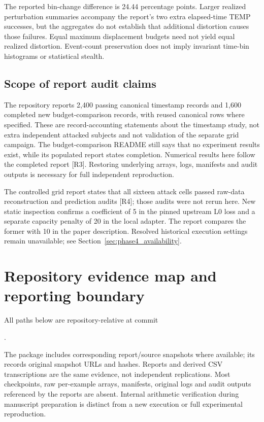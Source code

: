 \documentclass[10pt,onecolumn]{article}
\newcommand{\rref}[1]{\textup{[R#1]}}
\begin{document}
The reported bin-change difference is 24.44 percentage points. Larger realized perturbation summaries accompany the report's two extra elapsed-time TEMP successes, but the aggregates do not establish that additional distortion causes those failures. Equal maximum displacement budgets need not yield equal realized distortion. Event-count preservation does not imply invariant time-bin histograms or statistical stealth.

\subsection{Scope of report audit claims}
The repository reports 2,400 passing canonical timestamp records and 1,600 completed new budget-comparison records, with reused canonical rows where specified. These are record-accounting statements about the timestamp study, not extra independent attacked subjects and not validation of the separate grid campaign. The budget-comparison README still says that no experiment results exist, while its populated report states completion. Numerical results here follow the completed report \rref{3}. Restoring underlying arrays, logs, manifests and audit outputs is necessary for full independent reproduction.

The controlled grid report states that all sixteen attack cells passed raw-data reconstruction and prediction audits \rref{4}; those audits were not rerun here. New static inspection confirms a coefficient of 5 in the pinned upstream L0 loss and a separate capacity penalty of 20 in the local adapter. The report compares the former with 10 in the paper description. Resolved historical execution settings remain unavailable; see Section~\ref{sec:phase4_availability}.

\clearpage



\clearpage
\section{Repository evidence map and reporting boundary}
\label{sec:evidence}
All paths below are repository-relative at commit
\begin{center}
.
\end{center}
The package includes corresponding report/source snapshots where available; its  records original snapshot URLs and hashes. Reports and derived CSV transcriptions are the same evidence, not independent replications. Most checkpoints, raw per-example arrays, manifests, original logs and audit outputs referenced by the reports are absent. Internal arithmetic verification during manuscript preparation is distinct from a new execution or full experimental reproduction.
\end{document}
